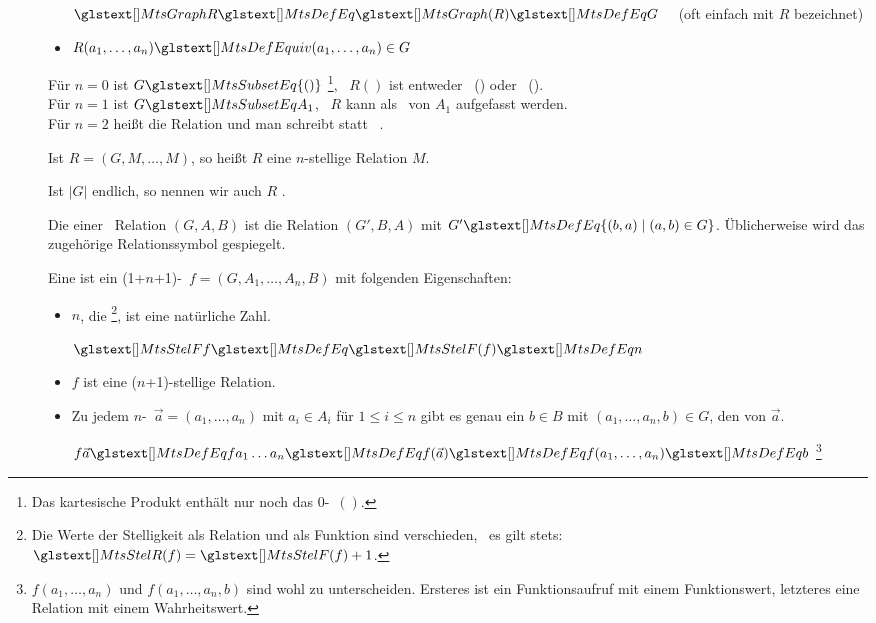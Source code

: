 \begin{description}
\begin{itemize}
		$\MtsGraph R \MtsDefEq \MtsGraph(R) \MtsDefEq G \quad$ (oft einfach mit $R$ bezeichnet)
		\item $R(a_1,\dots,a_n) \MtsDefEquiv (a_1,\dots,a_n) \in G$
	\end{itemize}
	Für $n=0$ ist $G \MtsSubsetEq \{()\}$%
	\footnote{%
		Das kartesische Produkt enthält nur noch das $0$-\Tupel\ $()$.
	},
	\textdh\ $R()$ ist entweder \TxtTrue\ (\MtsTrue) oder \TxtFalse\ (\MtsFalse).
	\\Für $n=1$ ist $G \MtsSubsetEq A_1$, \textdh\ $R$ kann als \Teilmenge\ von $A_1$ aufgefasst werden.
	\\Für $n=2$ heißt die Relation  und man schreibt  statt  \textbzw\ .

	Ist $R=(G,M,\dots,M)$, so heißt $R$ eine $n$-stellige Relation  $M$.

	Ist $|G|$ endlich, so nennen wir auch $R$ .

	\item [\Umkehrrelation] Die  einer \binaeren\ Relation $(G,A,B)$ ist die Relation $(G',B,A)$ mit $G' \MtsDefEq \{(b,a)\mid(a,b) \in G\}$.
	Üblicherweise wird das zugehörige Relationssymbol gespiegelt.

	\item [\Funktion] Eine  ist ein (1+$n$+1)-\Tupel\ $f = (G,A_1,\dots,A_n,B)$ mit folgenden Eigenschaften:
	\begin{itemize}
		\item $n$, die %
		\footnote{%
			Die Werte der Stelligkeit als Relation und als Funktion sind verschieden, \textdh\ es gilt stets: $\MtsStelR(f) = \MtsStelF(f) + 1$.
		},
		ist eine natürliche Zahl.

		$\MtsStelF f \MtsDefEq \MtsStelF(f) \MtsDefEq n$

		\item $f$ ist eine ($n$+1)-stellige Relation.

		\item Zu jedem $n$-\Tupel\ $\vec{a} = (a_1,\dots,a_n)$ mit $a_i \in A_i$ für $1 \le i \le n$ gibt es genau ein $b \in B$ mit $(a_1,\dots,a_n,b) \in G$, den  von $\vec{a}$.

		$f\vec{a} \MtsDefEq f a_1 \dots a_n \MtsDefEq f(\vec{a}) \MtsDefEq f(a_1,\dots,a_n) \MtsDefEq b$
		\footnote{%
			$f(a_1,\dots,a_n)$ und $f(a_1,\dots,a_n,b)$ sind wohl zu unterscheiden.
			Ersteres ist ein Funktionsaufruf mit einem Funktionswert, letzteres eine Relation mit einem Wahrheitswert.
		}


\end{itemize}
\end{description}
